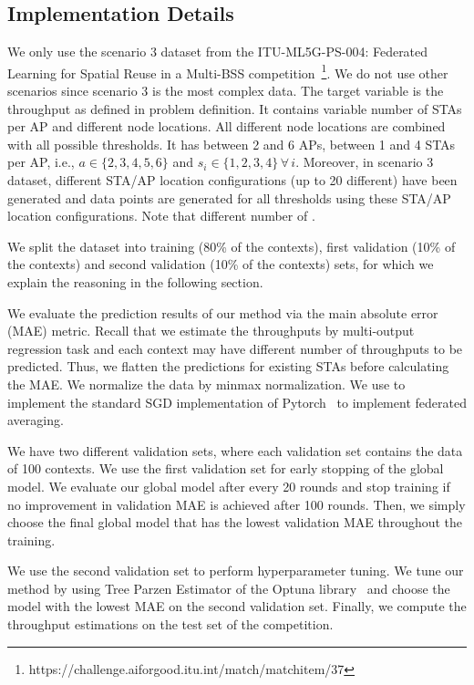 \documentclass[journal]{IEEEtran}
\begin{document}
 \subsection{Implementation Details}
 
We only use the scenario 3 dataset from the ITU-ML5G-PS-004: Federated Learning for Spatial Reuse in a Multi-BSS competition~\footnote{https://challenge.aiforgood.itu.int/match/matchitem/37}. We do not use other scenarios since scenario 3 is the most complex data. The target variable is the throughput as defined in problem definition. It contains variable number of STAs per AP and different node locations. All different node locations are combined with all possible thresholds. It has between 2 and 6 APs, between 1 and 4 STAs per AP, i.e., $a \in \{2,3,4,5,6\}$ and $s_i \in \{1,2,3,4\} \, \forall \, i$. Moreover, in scenario 3 dataset, different STA/AP location configurations (up to 20 different) have been generated and data points are generated for all thresholds using these STA/AP location configurations. Note that different number of .

We split the dataset into training (80\% of the contexts), first validation (10\% of the contexts) and second validation (10\% of the contexts) sets, for which we explain the reasoning in the following section.

We evaluate the prediction results of our method via the main absolute error (MAE) metric. Recall that we estimate the throughputs by multi-output regression task and each context may have different number of throughputs to be predicted. Thus, we flatten the predictions for existing STAs before calculating the MAE. We normalize the data by minmax normalization. We use to implement the standard SGD implementation of Pytorch~\cite{paszke2017automatic} to implement federated averaging.

We have two different validation sets, where each validation set contains the data of 100 contexts. We use the first validation set for early stopping of the global model. We evaluate our global model after every 20 rounds and stop training if no improvement in validation MAE is achieved after 100 rounds. Then, we simply choose the final global model that has the lowest validation MAE throughout the training. 

We use the second validation set to perform hyperparameter tuning. We tune our method by using Tree Parzen Estimator of the Optuna library~\cite{akiba2019optuna} and choose the model with the lowest MAE on the second validation set. Finally, we compute the throughput estimations on the test set of the competition.


\balance

\end{document}
